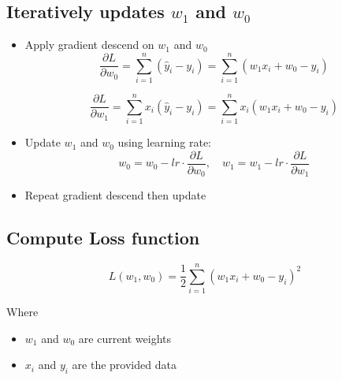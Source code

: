 \documentclass[12pt]{article}
\begin{document}
\subsection{Iteratively updates \( w_1 \) and \( w_0 \)}
\begin{itemize}
    \item Apply gradient descend on \( w_1 \) and \( w_0 \)
    \begin{equation}
    \frac{\partial L}{\partial w_0} = \sum_{i=1}^n (\hat{y}_i - y_i) = \sum_{i=1}^n (w_1 x_i + w_0 - y_i)
\end{equation}

\begin{equation}
    \frac{\partial L}{\partial w_1} = \sum_{i=1}^n x_i (\hat{y}_i - y_i) = \sum_{i=1}^n x_i (w_1 x_i + w_0 - y_i)
\end{equation}

    \item Update \( w_1 \) and \( w_0 \) using learning rate:
\begin{equation}
    w_0 = w_0 - lr \cdot \frac{\partial L}{\partial w_0}, \quad w_1 = w_1 - lr \cdot \frac{\partial L}{\partial w_1}
\end{equation}

    \item Repeat gradient descend then update

\end{itemize}

\subsection{Compute Loss function}

\begin{equation}
    L(w_1, w_0) = \frac{1}{2} \sum_{i=1}^n (w_1 x_i + w_0 - y_i)^2
\end{equation}

Where
\begin{itemize}
    \item \( w_1 \) and \( w_0 \) are current weights
    \item \(x_i\) and \(y_i\) are the provided data
\end{itemize}

\newpage
\end{document}
